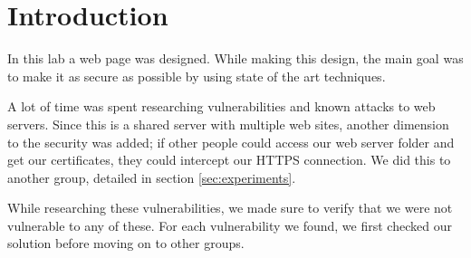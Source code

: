 \section{Introduction}

In this lab a web page was designed.
While making this design, the main goal was to make it as secure as possible by using state of the art techniques.

A lot of time was spent researching vulnerabilities and known attacks to web servers.
Since this is a shared server with multiple web sites, another dimension to the security was added;
if other people could access our web server folder and get our certificates, they could intercept our HTTPS connection.
We did this to another group, detailed in section \ref{sec:experiments}.

While researching these vulnerabilities, we made sure to verify that we were not vulnerable to any of these.
For each vulnerability we found, we first checked our solution before moving on to other groups.
